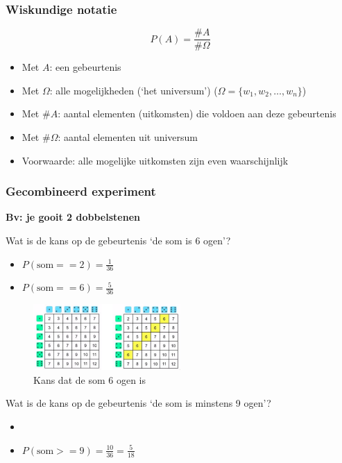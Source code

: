 \documentclass{article}
\begin{document}
\subsubsection{Wiskundige notatie}

\begin{equation}
    P(A) = \frac{\#A}{\#\Omega}
\end{equation}
    
\begin{itemize}
    \item Met $A$: een gebeurtenis
    \item Met $\Omega$: alle mogelijkheden (`het universum') ($\Omega = \{w_1, w_2, \dots, w_n\}$)
    \item Met $\#A$: aantal elementen (uitkomsten) die voldoen aan deze gebeurtenis
    \item Met $\#\Omega$: aantal elementen uit universum
    \item Voorwaarde: alle mogelijke uitkomsten zijn even waarschijnlijk
\end{itemize}

\subsubsection{Gecombineerd experiment}

\textbf{Bv: je gooit 2 dobbelstenen}

Wat is de kans op de gebeurtenis `de som is 6 ogen'?

\begin{itemize}
    \item $P(\text{som} == 2) = \frac{1}{36}$
    \item $P(\text{som} == 6) = \frac{5}{36}$
\end{itemize}

\begin{figure}[H]
    \centering
    \includegraphics[width=0.5\textwidth]{gecombineerd-experiment.png}
    \caption{Kans dat de som 6 ogen is}
\end{figure}

Wat is de kans op de gebeurtenis `de som is minstens 9 ogen'?

\begin{itemize}
    \item \item $P(\text{som} >= 9) = \frac{10}{36} = \frac{5}{18}$
\end{itemize}
\end{document}
